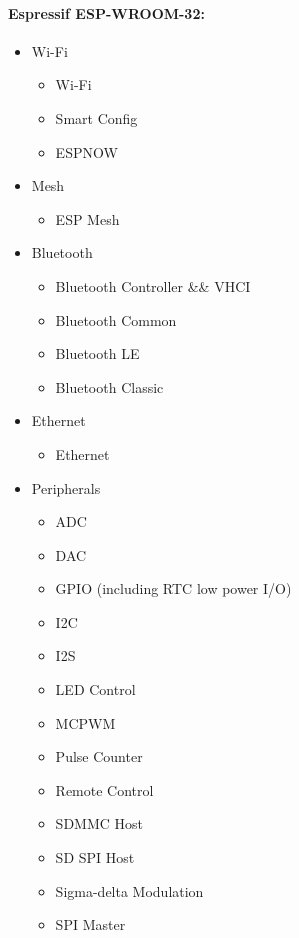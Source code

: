 \paragraph{Espressif ESP-WROOM-32:} \cite{ESP32API}
\begin{multicols}{2}
	\begin{itemize}
		\item Wi-Fi
		\begin{itemize}
			\setlength\itemsep{1pt}
			\item Wi-Fi
			\item Smart Config
			\item ESPNOW
		\end{itemize}
		\item Mesh
		\begin{itemize}
			\setlength\itemsep{1pt}
			\item ESP Mesh
		\end{itemize}
		\item Bluetooth
		\begin{itemize}
			\setlength\itemsep{1pt}
			\item Bluetooth Controller \&\& VHCI
			\item Bluetooth Common
			\item Bluetooth LE
			\item Bluetooth Classic
		\end{itemize}
		\item Ethernet
		\begin{itemize}
			\setlength\itemsep{1pt}
			\item Ethernet
		\end{itemize}
		\item Peripherals
		\begin{itemize}
			\setlength\itemsep{1pt}
			\item ADC
			\item DAC
			\item GPIO (including RTC low power I/O)
			\item I2C
			\item I2S
			\item LED Control
			\item MCPWM
			\item Pulse Counter
			\item Remote Control
			\item SDMMC Host
			\item SD SPI Host
			\item Sigma-delta Modulation
			\item SPI Master

\end{itemize}
\end{itemize}
\end{multicols}
